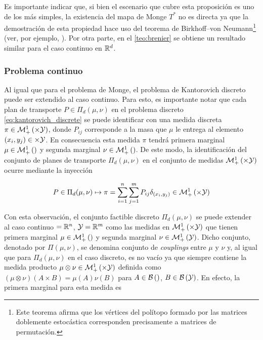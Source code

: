 Es importante indicar que, si bien el escenario que cubre esta proposición es uno de los más simples, la existencia del mapa de Monge $T^*$ no es directa ya que la demostración de esta propiedad hace uso del teorema de Birkhoff–von Neumann\footnote{Este teorema afirma que los vértices del polítopo formado por las matrices doblemente estocástica corresponden precisamente a matrices de permutación.} (ver, por ejemplo, \cite{Thorpe2018}). Por otra parte, en el \autoref{teo:brenier} se obtiene un resultado similar para el caso continuo en $\mathbb{R}^d$.

\subsubsection{Problema continuo}

Al igual que para el problema de Monge, el problema de Kantorovich discreto puede ser extendido al caso continuo. Para esto, es importante notar que cada plan de transporte $P\in\Pi_d(\mu,\nu)$ en el problema discreto \eqref{eq:kantorovich_discrete} se puede identificar con una medida discreta $\pi\in\probmeasure{\xspace\times\yspace}$, donde $P_{ij}$ corresponde a la masa que $\mu$ le entrega al elemento $(x_i,y_j)\in\times\mathcal{Y}$. En consecuencia esta medida $\pi$ tendrá primera marginal $\mu\in\mathcal{M}_+^1\left(\right)$ y segunda marginal $\nu\in\mathcal{M}_+^1\left(\right)$. De este modo, la identificación del conjunto de planes de transporte $\Pi_d(\mu,\nu)$ en el conjunto de medidas $\probmeasure{\xspace\times\yspace}$ ocurre mediante la inyección

\begin{equation}
	\label{eq:coupling_identification}
	P\in\Pi_d(\mu,\nu)\mapsto \pi = \sum_{i=1}^{n}\sum_{j=1}^{m} P_{ij}\delta_{(x_i, y_j)} \in\probmeasure{\xspace\times\yspace}
\end{equation}

Con esta observación, el conjunto factible discreto $\Pi_d(\mu,\nu)$ se puede extender al caso continuo $=\mathbb{R}^n$, $\mathcal{Y}=\mathbb{R}^m$ como las medidas en $\probmeasure{\xspace\times\yspace}$ que tienen primera marginal $\mu\in\mathcal{M}_+^1\left(\right)$ y segunda marginal $\nu\in\mathcal{M}_+^1\left(\mathcal{Y}\right)$. Dicho conjunto, denotado por $\Pi(\mu,\nu)$, se denomina conjunto de \textit{couplings} entre $\mu$ y $\nu$ y, al igual que para $\Pi_d(\mu,\nu)$ en el caso discreto, es no vacío ya que siempre contiene la medida producto $\mu\otimes\nu\in\probmeasure{\xspace\times\yspace}$ definida como $(\mu\otimes\nu)(A\times B)=\mu(A)\nu(B)$ para $A\in\mathcal{B}\left(\right)$, $B\in\mathcal{B}\left(\mathcal{Y}\right)$. En efecto, la primera marginal para esta medida es

